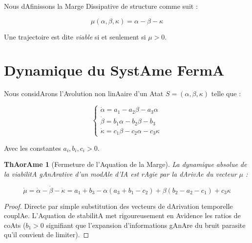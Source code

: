 \documentclass[11pt,a4paper]{article}
\newtheorem{theorem}{ThAorAme}
\begin{document}
Nous dAfinissons la Marge Dissipative de structure comme suit :

\begin{equation}

   \mu(\alpha, \beta, \kappa) = \alpha - \beta - \kappa

\end{equation}



Une trajectoire est dite \textit{viable} si et seulement si $\mu > 0$.



\section{Dynamique du SystAme FermA}

Nous considArons l'Avolution non linAaire d'un Atat $S = (\alpha, \beta, \kappa)$ telle que :

\begin{equation}

    \begin{cases}

    \dot\alpha = a_1 - a_2\beta - a_3\alpha \\

    \dot\beta = b_1\alpha - b_2\beta - b_3 \\

    \dot\kappa = c_1\beta - c_2\alpha - c_3\kappa

    \end{cases}

\end{equation}

Avec les constantes $a_i, b_i, c_i > 0$.



\begin{theorem}[Fermeture de l'Aquation de la Marge]

La dynamique absolue de la viabilitA gAnArative d'un modAle d'IA est rAgie par la dArivAe du vecteur $\mu$ :

\begin{equation}

    \dot\mu = \dot\alpha - \dot\beta - \dot\kappa = a_1+b_3 - \alpha(a_3+b_1-c_2) + \beta(b_2-a_2-c_1) + c_3\kappa

\end{equation}

\end{theorem}

\begin{proof}

Directe par simple substitution des vecteurs de dArivation temporelle couplAe. L'Aquation de stabilitA met rigoureusement en Avidence les ratios de coAts ($b_1 > 0$ signifiant que l'expansion d'informations gAnAre du bruit parasite qu'il convient de limiter).

\end{proof}
\end{document}
